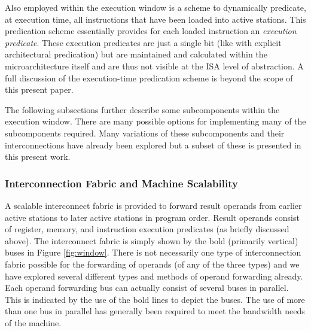 \documentclass[10pt,dvips]{article}
\begin{document}
Also employed within the execution window is a scheme to
dynamically predicate, at execution time, 
all instructions that have been loaded
into active stations.  
This predication scheme essentially provides for each loaded instruction
an \textit{execution predicate}.  These execution predicates
are just a single bit (like with explicit architectural predication)
but are maintained and calculated within the microarchitecture
itself and are thus not visible at the ISA level of abstraction.
A full discussion of the execution-time predication scheme
is beyond the scope of this present paper.

The following subsections further describe some subcomponents
within the execution window.
There are many possible options for implementing many
of the subcomponents required.
Many variations of these subcomponents and their interconnections
have already been explored but a subset of these is
presented in this present work.
%
\subsubsection{Interconnection Fabric and Machine Scalability}
%
A scalable interconnect fabric 
is provided to forward result
operands from earlier active stations to later active stations in
program order.  Result operands consist of register, memory, and
instruction execution predicates (as briefly discussed above).  
The interconnect fabric is simply shown by
the bold (primarily vertical) buses in 
Figure \ref{fig:window}.
There is not necessarily one type of interconnection
fabric possible for the forwarding of operands (of any of the
three types)
and we have explored several
different types and methods of operand forwarding already.
Each operand forwarding bus can actually consist of several
buses in parallel.  This is indicated by the use of the
bold lines to depict the buses.  The use of more than one
bus in parallel has generally been required to meet
the bandwidth needs of the machine.
\end{document}
